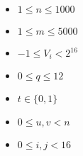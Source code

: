 \begin{itemize}
\item $1 \le n \le 1000$
\item $1 \le m \le 5000$
\item $-1 \le V_i < 2^{16}$
\item $0 \le q \le 12$
\item $t \in \{0, 1\}$
\item $0 \le u, v < n$
\item $0 \le i, j < 16$
\end{itemize}
